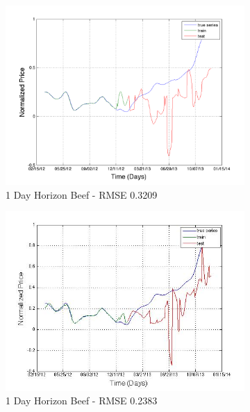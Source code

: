 \begin{figure}
        \begin{subfigure}[b]{0.5\textwidth}
                \includegraphics[width=\textwidth]{img/model/exp2/beef/pred_1}
                \caption{1 Day Horizon Beef - RMSE 0.3209  }
                \label{fig:tiger}
        \end{subfigure}%
              \begin{subfigure}[b]{0.5\textwidth}
                \includegraphics[width=\textwidth]{img/model/exp2_final/beef_1}
                \caption{1 Day Horizon Beef  - RMSE 0.2383 }
                \label{fig:tiger}
        \end{subfigure}%
      	 \hfill
        \begin{subfigure}[b]{0.5\textwidth}

\end{subfigure}
\end{figure}
